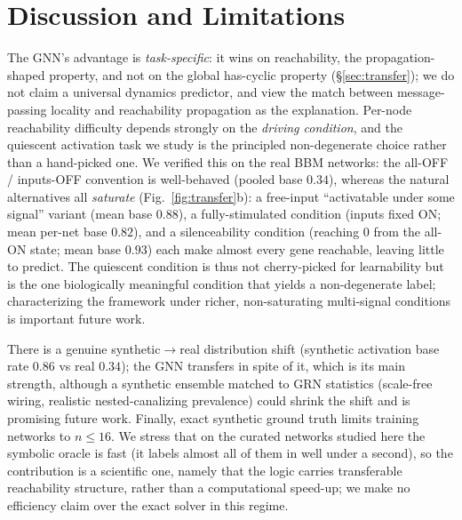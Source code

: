\documentclass[journal]{IEEEtran}
\begin{document}
\section{Discussion and Limitations}
The GNN's advantage is \emph{task-specific}: it wins on reachability, the
propagation-shaped property, and not on the global has-cyclic property
(\S\ref{sec:transfer}); we do not claim a universal dynamics predictor, and view the
match between message-passing locality and reachability propagation as the explanation.
Per-node reachability difficulty depends strongly on the \emph{driving condition}, and
the quiescent activation task we study is the principled non-degenerate choice rather
than a hand-picked one. We verified this on the real BBM networks: the all-OFF /
inputs-OFF convention is well-behaved (pooled base $0.34$), whereas the natural
alternatives all \emph{saturate} (Fig.~\ref{fig:transfer}b): a free-input ``activatable
under some signal'' variant (mean base $0.88$), a fully-stimulated condition (inputs
fixed ON; mean per-net base $0.82$), and a silenceability condition (reaching $0$ from
the all-ON state; mean base $0.93$) each make almost every gene reachable, leaving little
to predict. The quiescent condition is thus not cherry-picked for learnability but is the
one biologically meaningful condition that yields a non-degenerate label; characterizing
the framework under richer, non-saturating multi-signal conditions is important future
work.

There is a genuine synthetic$\to$real distribution shift (synthetic activation base rate
$0.86$ vs real $0.34$); the GNN transfers in spite of it, which is its main strength, although a
synthetic ensemble matched to GRN statistics (scale-free wiring, realistic
nested-canalizing prevalence) could shrink the shift and is promising future work.
Finally, exact synthetic ground truth limits training networks to $n\le16$. We stress
that on the curated networks studied here the symbolic oracle is fast (it labels almost
all of them in well under a second), so the contribution is a scientific one, namely
that the logic carries transferable reachability structure, rather than a computational speed-up; we
make no efficiency claim over the exact solver in this regime.
\end{document}
